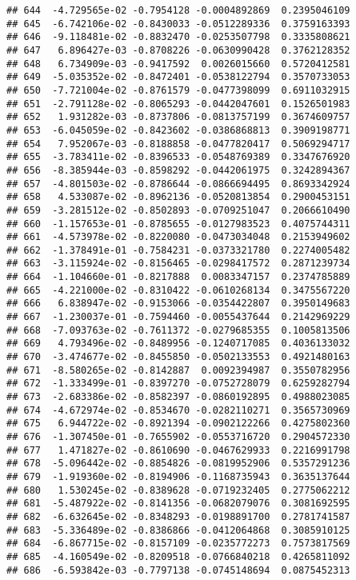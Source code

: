 \documentclass[
]{article}
\begin{document}
\begin{verbatim}
## 644  -4.729565e-02 -0.7954128 -0.0004892869  0.2395046109
## 645  -6.742106e-02 -0.8430033 -0.0512289336  0.3759163393
## 646  -9.118481e-02 -0.8832470 -0.0253507798  0.3335808621
## 647   6.896427e-03 -0.8708226 -0.0630990428  0.3762128352
## 648   6.734909e-03 -0.9417592  0.0026015660  0.5720412581
## 649  -5.035352e-02 -0.8472401 -0.0538122794  0.3570733053
## 650  -7.721004e-02 -0.8761579 -0.0477398099  0.6911032915
## 651  -2.791128e-02 -0.8065293 -0.0442047601  0.1526501983
## 652   1.931282e-03 -0.8737806 -0.0813757199  0.3674609757
## 653  -6.045059e-02 -0.8423602 -0.0386868813  0.3909198771
## 654   7.952067e-03 -0.8188858 -0.0477820417  0.5069294717
## 655  -3.783411e-02 -0.8396533 -0.0548769389  0.3347676920
## 656  -8.385944e-03 -0.8598292 -0.0442061975  0.3242894367
## 657  -4.801503e-02 -0.8786644 -0.0866694495  0.8693342924
## 658   4.533087e-02 -0.8962136 -0.0520813854  0.2900453151
## 659  -3.281512e-02 -0.8502893 -0.0709251047  0.2066610490
## 660  -1.157653e-01 -0.8785655 -0.0127983523  0.4075744311
## 661  -4.573978e-02 -0.8220080 -0.0473034048  0.2153949602
## 662  -1.378491e-01 -0.7584231 -0.0373321780  0.2274005482
## 663  -3.115924e-02 -0.8156465 -0.0298417572  0.2871239734
## 664  -1.104660e-01 -0.8217888  0.0083347157  0.2374785889
## 665  -4.221000e-02 -0.8310422 -0.0610268134  0.3475567220
## 666   6.838947e-02 -0.9153066 -0.0354422807  0.3950149683
## 667  -1.230037e-01 -0.7594460 -0.0055437644  0.2142969229
## 668  -7.093763e-02 -0.7611372 -0.0279685355  0.1005813506
## 669   4.793496e-02 -0.8489956 -0.1240717085  0.4036133032
## 670  -3.474677e-02 -0.8455850 -0.0502133553  0.4921480163
## 671  -8.580265e-02 -0.8142887  0.0092394987  0.3550782956
## 672  -1.333499e-01 -0.8397270 -0.0752728079  0.6259282794
## 673  -2.683386e-02 -0.8582397 -0.0860192895  0.4988023085
## 674  -4.672974e-02 -0.8534670 -0.0282110271  0.3565730969
## 675   6.944722e-02 -0.8921394 -0.0902122266  0.4275802360
## 676  -1.307450e-01 -0.7655902 -0.0553716720  0.2904572330
## 677   1.471827e-02 -0.8610690 -0.0467629933  0.2216991798
## 678  -5.096442e-02 -0.8854826 -0.0819952906  0.5357291236
## 679  -1.919360e-02 -0.8194906 -0.1168735943  0.3635137644
## 680   1.530245e-02 -0.8389628 -0.0719232405  0.2775062212
## 681  -5.487922e-02 -0.8141356 -0.0682079076  0.3081692595
## 682  -6.632645e-02 -0.8348293 -0.0198891700  0.2781741587
## 683  -5.336489e-02 -0.8386866 -0.0412064868  0.3085910125
## 684  -6.867715e-02 -0.8157109 -0.0235772273  0.7573817569
## 685  -4.160549e-02 -0.8209518 -0.0766840218  0.4265811092
## 686  -6.593842e-03 -0.7797138 -0.0745148694  0.0875452313

\end{verbatim}
\end{document}
